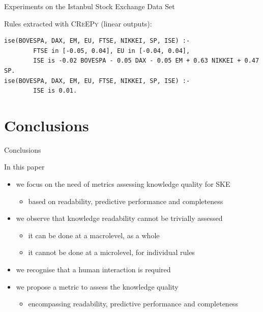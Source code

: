 \documentclass{beamer}
\newcommand{\creepy}{\textsc{CReEPy}}
\begin{document}
\begin{frame}{Experiments on the Istanbul Stock Exchange Data Set}
	\framebreak
	
	Rules extracted with \creepy{} (linear outputs):
	\begin{lstlisting}
ise(BOVESPA, DAX, EM, EU, FTSE, NIKKEI, SP, ISE) :-
		FTSE in [-0.05, 0.04], EU in [-0.04, 0.04],
		ISE is -0.02 BOVESPA - 0.05 DAX - 0.05 EM + 0.63 NIKKEI + 0.47 SP.
ise(BOVESPA, DAX, EM, EU, FTSE, NIKKEI, SP, ISE) :- 
		ISE is 0.01.
	\end{lstlisting}

\end{frame}

\section{Conclusions}

\begin{frame}[c]{Conclusions}
	\vfill
	\begin{block}{In this paper}
		\smallskip
		\begin{itemize}
			\item we focus on the need of metrics assessing knowledge quality for SKE
			\begin{itemize}
				\item based on readability, predictive performance and completeness
			\end{itemize}
			\smallskip
			\item we observe that knowledge readability cannot be trivially assessed
			\begin{itemize}
				\item it can be done at a macrolevel, as a whole
				\item it cannot be done at a microlevel, for individual rules
			\end{itemize}
			\smallskip
			\item we recognise that a human interaction is required 
			\smallskip
			\item we propose a metric to assess the knowledge quality
			\begin{itemize}
				\item encompassing readability, predictive performance and completeness
			\end{itemize}
		\end{itemize}	
		\smallskip
	\end{block}

	\vfill
\end{frame}
\end{document}
